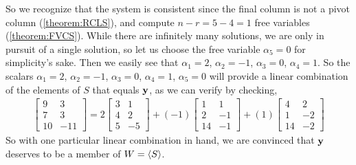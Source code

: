 \documentclass{ximera}
\begin{document}
\begin{example}[A subspace of $M_{32}$]
  So we recognize that the system is consistent since the final column
  is not a pivot column (\ref{theorem:RCLS}), and compute $n-r=5-4=1$
  free variables (\ref{theorem:FVCS}).  While there are infinitely
  many solutions, we are only in pursuit of a single solution, so let
  us choose the free variable $\alpha_5=0$ for simplicity's sake.
  Then we easily see that $\alpha_1=2$, $\alpha_2=-1$, $\alpha_3=0$,
  $\alpha_4=1$.  So the scalars $\alpha_1=2$, $\alpha_2=-1$,
  $\alpha_3=0$, $\alpha_4=1$, $\alpha_5=0$ will provide a linear
  combination of the elements of $S$ that equals $\mathbf{y}$, as we can
  verify by checking,
  \begin{align*}
    \begin{bmatrix}
      9 & 3 \\ 7 & 3 \\ 10 & -11
    \end{bmatrix}
                             =
                             2
                             \begin{bmatrix}
                               3 & 1 \\ 4 & 2 \\ 5 & -5
                             \end{bmatrix}
                                                     +(-1)
                                                     \begin{bmatrix}
                                                       1 & 1 \\ 2 & -1 \\ 14 & -1
                                                     \end{bmatrix}
                                                                               +(1)
                                                                               \begin{bmatrix}
                                                                                 4 & 2 \\ 1 & -2 \\ 14 & -2
                                                                               \end{bmatrix}
  \end{align*}
  So with one particular linear combination in hand, we are convinced
  that $\mathbf{y}$ deserves to be a member of $W=\left\langle S\right\rangle$.


\end{example}
\end{document}

